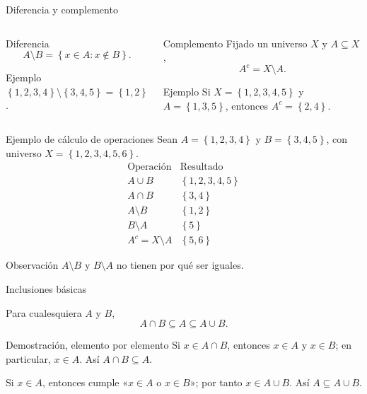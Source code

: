 \documentclass[aspectratio=169,11pt]{beamer}
\newcommand{\Set}[1]{\left\{#1\right\}}
\begin{document}
\begin{frame}{Diferencia y complemento}
    \begin{columns}[T,onlytextwidth]
        \begin{block}{Diferencia}
            \[
              A\setminus B=\Set{x\in A:x\notin B}.
            \]
            \begin{exampleblock}{Ejemplo}
                $\Set{1,2,3,4}\setminus\Set{3,4,5}=\Set{1,2}$.
            \end{exampleblock}
        \end{block}
        \begin{block}{Complemento}
            Fijado un universo $X$ y $A\subseteq X$,
            \[
              A^c=X\setminus A.
            \]
            \begin{exampleblock}{Ejemplo}
                Si $X=\Set{1,2,3,4,5}$ y $A=\Set{1,3,5}$, entonces $A^c=\Set{2,4}$.
            \end{exampleblock}
        \end{block}
    \end{columns}
\end{frame}

\begin{frame}{Ejemplo de cálculo de operaciones}
    Sean $A=\Set{1,2,3,4}$ y $B=\Set{3,4,5}$, con universo $X=\Set{1,2,3,4,5,6}$.
    \vspace{.2cm}
    \[
    \begin{array}{c|l}
        \text{Operación} & \text{Resultado}\\\hline
        A\cup B & \Set{1,2,3,4,5}\\
        A\cap B & \Set{3,4}\\
        A\setminus B & \Set{1,2}\\
        B\setminus A & \Set{5}\\
        A^c=X\setminus A & \Set{5,6}
    \end{array}
    \]
    \begin{alertblock}{Observación}
        $A\setminus B$ y $B\setminus A$ no tienen por qué ser iguales.
    \end{alertblock}
\end{frame}

\begin{frame}{Inclusiones básicas}
    \begin{theorem}
        Para cualesquiera $A$ y $B$,
        \[
          A\cap B\subseteq A\subseteq A\cup B.
        \]
    \end{theorem}
    \begin{block}{Demostración, elemento por elemento}
        Si $x\in A\cap B$, entonces $x\in A$ y $x\in B$; en particular, $x\in A$. Así $A\cap B\subseteq A$.

        Si $x\in A$, entonces cumple «$x\in A$ o $x\in B$»; por tanto $x\in A\cup B$. Así $A\subseteq A\cup B$.
    \end{block}
\end{frame}
\end{document}

